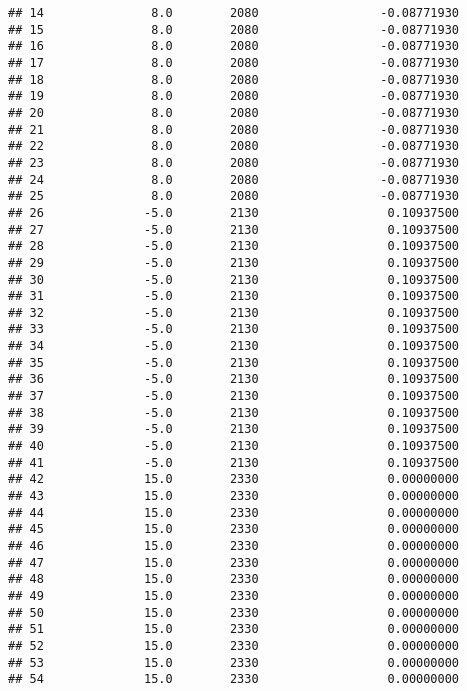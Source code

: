 \documentclass[]{article}
\begin{document}
\begin{verbatim}
## 14               8.0        2080                 -0.08771930
## 15               8.0        2080                 -0.08771930
## 16               8.0        2080                 -0.08771930
## 17               8.0        2080                 -0.08771930
## 18               8.0        2080                 -0.08771930
## 19               8.0        2080                 -0.08771930
## 20               8.0        2080                 -0.08771930
## 21               8.0        2080                 -0.08771930
## 22               8.0        2080                 -0.08771930
## 23               8.0        2080                 -0.08771930
## 24               8.0        2080                 -0.08771930
## 25               8.0        2080                 -0.08771930
## 26              -5.0        2130                  0.10937500
## 27              -5.0        2130                  0.10937500
## 28              -5.0        2130                  0.10937500
## 29              -5.0        2130                  0.10937500
## 30              -5.0        2130                  0.10937500
## 31              -5.0        2130                  0.10937500
## 32              -5.0        2130                  0.10937500
## 33              -5.0        2130                  0.10937500
## 34              -5.0        2130                  0.10937500
## 35              -5.0        2130                  0.10937500
## 36              -5.0        2130                  0.10937500
## 37              -5.0        2130                  0.10937500
## 38              -5.0        2130                  0.10937500
## 39              -5.0        2130                  0.10937500
## 40              -5.0        2130                  0.10937500
## 41              -5.0        2130                  0.10937500
## 42              15.0        2330                  0.00000000
## 43              15.0        2330                  0.00000000
## 44              15.0        2330                  0.00000000
## 45              15.0        2330                  0.00000000
## 46              15.0        2330                  0.00000000
## 47              15.0        2330                  0.00000000
## 48              15.0        2330                  0.00000000
## 49              15.0        2330                  0.00000000
## 50              15.0        2330                  0.00000000
## 51              15.0        2330                  0.00000000
## 52              15.0        2330                  0.00000000
## 53              15.0        2330                  0.00000000
## 54              15.0        2330                  0.00000000

\end{verbatim}
\end{document}
